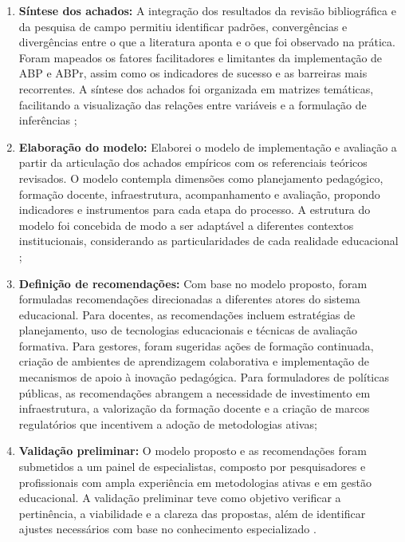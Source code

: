 \begin{enumerate}
    \item \textbf{Síntese dos achados:} A integração dos resultados da revisão bibliográfica e da pesquisa de campo permitiu identificar padrões, convergências e divergências entre o que a literatura aponta e o que foi observado na prática. Foram mapeados os fatores facilitadores e limitantes da implementação de ABP e ABPr, assim como os indicadores de sucesso e as barreiras mais recorrentes. A síntese dos achados foi organizada em matrizes temáticas, facilitando a visualização das relações entre variáveis e a formulação de inferências \cite{CRESWELL2018};
    \item \textbf{Elaboração do modelo:} Elaborei o modelo de implementação e avaliação a partir da articulação dos achados empíricos com os referenciais teóricos revisados. O modelo contempla dimensões como planejamento pedagógico, formação docente, infraestrutura, acompanhamento e avaliação, propondo indicadores e instrumentos para cada etapa do processo. A estrutura do modelo foi concebida de modo a ser adaptável a diferentes contextos institucionais, considerando as particularidades de cada realidade educacional \cite{SANTOS2024};
    \item \textbf{Definição de recomendações:} Com base no modelo proposto, foram formuladas recomendações direcionadas a diferentes atores do sistema educacional. Para docentes, as recomendações incluem estratégias de planejamento, uso de tecnologias educacionais e técnicas de avaliação formativa. Para gestores, foram sugeridas ações de formação continuada, criação de ambientes de aprendizagem colaborativa e implementação de mecanismos de apoio à inovação pedagógica. Para formuladores de políticas públicas, as recomendações abrangem a necessidade de investimento em infraestrutura, a valorização da formação docente e a criação de marcos regulatórios que incentivem a adoção de metodologias ativas;
    \item \textbf{Validação preliminar:} O modelo proposto e as recomendações foram submetidos a um painel de especialistas, composto por pesquisadores e profissionais com ampla experiência em metodologias ativas e em gestão educacional. A validação preliminar teve como objetivo verificar a pertinência, a viabilidade e a clareza das propostas, além de identificar ajustes necessários com base no conhecimento especializado \cite{BARDIN2016}.
\end{enumerate}


